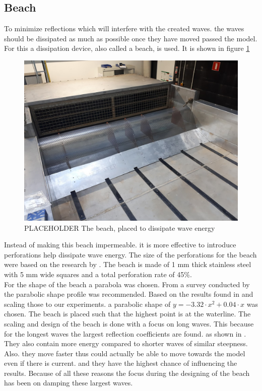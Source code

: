 \subsection{Beach}
\label{sec:beach}
To minimize reflections which will interfere with the created waves. the waves should be dissipated as much as possible once they have moved passed the model.
For this a dissipation device, also called a beach, is used. It is shown in figure \ref{fig:exp_beach} \\
\begin{figure}
	\centering
	\includegraphics[width=0.8\linewidth]{figs/Picture_beach.jpg}
	\caption{PLACEHOLDER The beach, placed to dissipate wave energy}
	\label{fig:exp_beach}
\end{figure}


Instead of making this beach impermeable. it is more effective to introduce perforations help dissipate wave energy. The size of the perforations for the beach were based on the research by \citet{Chegini1994}. The beach is made of 1 mm thick stainless steel with 5 mm wide squares and a total perforation rate of 45\%.  \\
For the shape of the beach a parabola was chosen. From a survey conducted by \citet{Ouellet1986} the parabolic shape profile was recommended. Based on the results found in \citet{Hodaei2016} and scaling those to our experiments. a parabolic shape of $y = -3.32 \cdot x^2 + 0.04\cdot x$ was chosen. The beach is placed such that the highest point is at the waterline. The scaling and design of the beach is done with a focus on long waves. This because for the longest waves the largest reflection coefficients are found. as shown in \cite{Suh2003}. They also contain more energy compared to shorter waves of similar steepness. Also. they move faster thus could actually be able to move towards the model even if there is current. and they have the highest chance of influencing the results. Because of all these reasons the focus during the designing of the beach has been on damping these largest waves.

